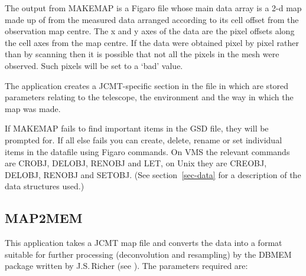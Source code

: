\documentclass[twoside,11pt]{article}
\newcommand{\xlabel}[1]{}
\renewcommand{\_}{\texttt{\symbol{95}}}
\begin{document}
\goodbreak

The output from MAKEMAP is a Figaro file whose main data array is a
2-d map made up of from the measured data arranged according to its
cell offset from the observation map centre. The x and y axes of the
data are the pixel offsets along the cell axes from the map centre. If
the data were obtained pixel by pixel rather than by scanning then it
is possible that not all the pixels in the mesh were observed. Such
pixels will be set to a `bad' value.

The application creates a JCMT-specific section in the file in which
are stored parameters relating to the telescope, the environment and
the way in which the map was made.

If MAKEMAP fails to find important items in the GSD file, they will be
prompted for. If all else fails you can create, delete, rename or set
individual items in the datafile using Figaro commands.
On VMS the relevant commands are CROBJ, DELOBJ, RENOBJ and LET, on Unix
they are CREOBJ, DELOBJ, RENOBJ and SETOBJ.
(See section~\ref{sec-data} for a description
of the data structures used.)


\goodbreak

\subsection {\xlabel{MAP2MEM}MAP2MEM}

This application takes a JCMT map file and converts the data into a format
suitable for further processing (deconvolution and resampling) by the DBMEM
package written by J.S.\,Richer (see \cite{dbmem}). The parameters required
are:

\goodbreak
\end{document}
